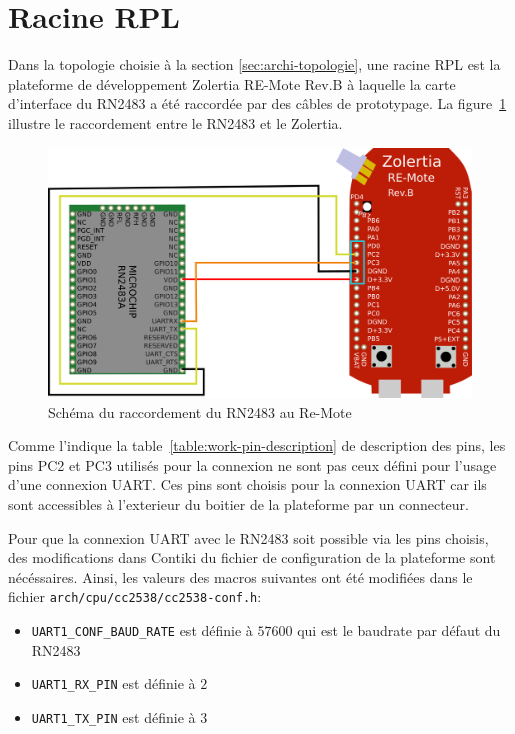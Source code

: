 \section{Racine RPL}\label{sec:work-rpl-root}
\renewcommand{\rightmark}{Racine RPL}

    Dans la topologie choisie à la section \ref{sec:archi-topologie}, une racine RPL est la plateforme de développement Zolertia RE-Mote Rev.B à laquelle la carte d'interface du RN2483 a été raccordée par des câbles de prototypage. La figure~\ref{fig:work-montage} illustre le raccordement entre le RN2483 et le Zolertia.
    
    \begin{figure}[H]
        \centering
        \includegraphics[scale=0.35]{res/pictures/montage.png}
        \caption{Schéma du raccordement du RN2483 au Re-Mote}
        \label{fig:work-montage}
    \end{figure}

    Comme l'indique la table~\ref{table:work-pin-description} de description des pins, les pins PC2 et PC3 utilisés pour la connexion ne sont pas ceux défini pour l'usage d'une connexion UART. Ces pins sont choisis pour la connexion UART car ils sont accessibles à l'exterieur du boitier de la plateforme par un connecteur.
    
    Pour que la connexion UART avec le RN2483 soit possible via les pins choisis, des modifications 
    dans Contiki du fichier de configuration de la plateforme sont nécéssaires.
    Ainsi, les valeurs des macros suivantes ont été modifiées dans le fichier \texttt{arch/cpu/cc2538/cc2538-conf.h}:
    \begin{itemize}
        \item \texttt{UART1\_CONF\_BAUD\_RATE} est définie à $57600$ qui est le baudrate par défaut du RN2483
        \item \texttt{UART1\_RX\_PIN} est définie à $2$
        \item \texttt{UART1\_TX\_PIN} est définie à $3$
    \end{itemize}

